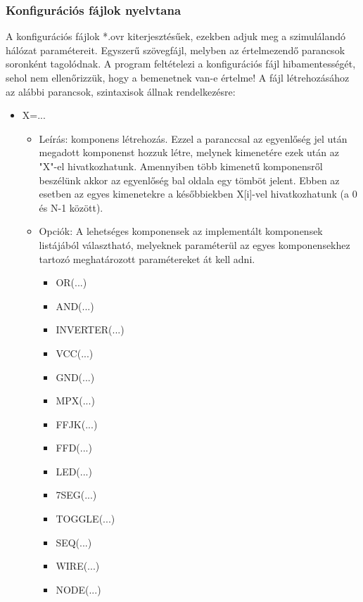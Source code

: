\subsubsection{Konfigurációs fájlok nyelvtana}
A konfigurációs fájlok *.ovr kiterjesztésűek, ezekben adjuk meg a szimulálandó hálózat paramétereit. Egyszerű szövegfájl, melyben az értelmezendő parancsok soronként tagolódnak. A program feltételezi a konfigurációs fájl hibamentességét, sehol nem ellenőrizzük, hogy a bemenetnek van-e értelme!\linebreak
A fájl létrehozásához az alábbi parancsok, szintaxisok állnak rendelkezésre:

\begin{itemize}
\item X=...
	\begin{itemize}
	\item Leírás: komponens létrehozás. Ezzel a paranccsal az egyenlőség jel után megadott komponenst hozzuk létre, melynek kimenetére ezek után az "X"-el hivatkozhatunk. Amennyiben több kimenetű komponensről beszélünk akkor az egyenlőség bal oldala egy tömböt jelent. Ebben az esetben az egyes kimenetekre a későbbiekben X[i]-vel hivatkozhatunk (a 0 és N-1 között).
	\item Opciók: A lehetséges komponensek az implementált komponensek listájából választható, melyeknek paraméterül az egyes komponensekhez tartozó meghatározott paramétereket át kell adni.
		\begin{itemize}
			\item OR(...)			%
			\item AND(...)			%
			\item INVERTER(...)		%
			\item VCC(...)			%
			\item GND(...)			%
			\item MPX(...)			%
			\item FFJK(...)			%
			\item FFD(...)			%
			\item LED(...)			%
			\item 7SEG(...)			%
			\item TOGGLE(...)		%
			\item SEQ(...)			%
			\item WIRE(...)			%
			\item NODE(...)			%
		\end{itemize}
	\end{itemize}


\end{itemize}
